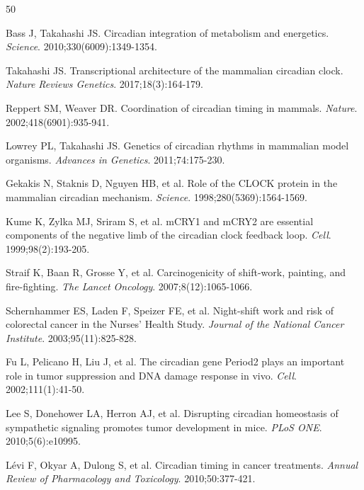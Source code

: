 \documentclass[11pt,a4paper]{article}
\begin{document}

\begin{thebibliography}{50}

Bass J, Takahashi JS.
Circadian integration of metabolism and energetics.
\textit{Science}. 2010;330(6009):1349-1354.

Takahashi JS.
Transcriptional architecture of the mammalian circadian clock.
\textit{Nature Reviews Genetics}. 2017;18(3):164-179.

Reppert SM, Weaver DR.
Coordination of circadian timing in mammals.
\textit{Nature}. 2002;418(6901):935-941.

Lowrey PL, Takahashi JS.
Genetics of circadian rhythms in mammalian model organisms.
\textit{Advances in Genetics}. 2011;74:175-230.

Gekakis N, Staknis D, Nguyen HB, et al.
Role of the CLOCK protein in the mammalian circadian mechanism.
\textit{Science}. 1998;280(5369):1564-1569.

Kume K, Zylka MJ, Sriram S, et al.
mCRY1 and mCRY2 are essential components of the negative limb of the circadian clock feedback loop.
\textit{Cell}. 1999;98(2):193-205.

Straif K, Baan R, Grosse Y, et al.
Carcinogenicity of shift-work, painting, and fire-fighting.
\textit{The Lancet Oncology}. 2007;8(12):1065-1066.

Schernhammer ES, Laden F, Speizer FE, et al.
Night-shift work and risk of colorectal cancer in the Nurses' Health Study.
\textit{Journal of the National Cancer Institute}. 2003;95(11):825-828.

Fu L, Pelicano H, Liu J, et al.
The circadian gene Period2 plays an important role in tumor suppression and DNA damage response in vivo.
\textit{Cell}. 2002;111(1):41-50.

Lee S, Donehower LA, Herron AJ, et al.
Disrupting circadian homeostasis of sympathetic signaling promotes tumor development in mice.
\textit{PLoS ONE}. 2010;5(6):e10995.

L\'evi F, Okyar A, Dulong S, et al.
Circadian timing in cancer treatments.
\textit{Annual Review of Pharmacology and Toxicology}. 2010;50:377-421.


\end{thebibliography}
\end{document}
